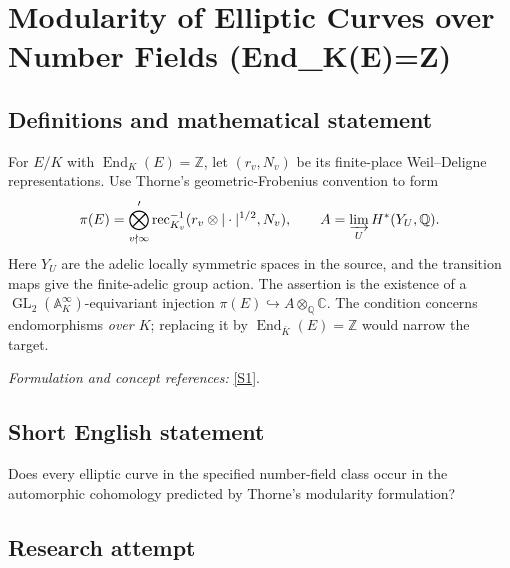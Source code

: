 \documentclass[11pt,a4paper]{article}
\newcommand{\Z}{\mathbb{Z}}
\newcommand{\Q}{\mathbb{Q}}
\newcommand{\C}{\mathbb{C}}
\newcommand{\A}{\mathbb{A}}
\newcommand{\sref}[2]{\hyperlink{source:#1:#2}{[S#2]}}
\newif\ifshowcatalogue
\newcommand{\cataloguescope}[1]{\ifshowcatalogue
 \paragraph{Exact scope in the supplied catalogue.}
 \begin{quote}\small #1\end{quote}\fi}
\numberwithin{equation}{section}
\begin{document}
\setcounter{section}{0}
\clearpage
\section*{\texorpdfstring{Modularity of Elliptic Curves over Number Fields (End\_K(E)=Z)}{Modularity of Elliptic Curves over Number Fields (End\_K(E)=Z)}}\label{statement}
\subsection{Definitions and mathematical statement}
For $E/K$ with $\operatorname{End}_K(E)=\Z$, let $(r_v,N_v)$ be its finite-place Weil--Deligne representations. Use Thorne's geometric-Frobenius convention to form
\[
 \pi(E)=\bigotimes_{v\nmid\infty}'
 \operatorname{rec}_{K_v}^{-1}(r_v\otimes|\cdot|^{1/2},N_v),\qquad
 A=\varinjlim_U H^*(Y_U,\Q).
\]
Here $Y_U$ are the adelic locally symmetric spaces in the source, and the transition maps give the finite-adelic group action. The assertion is the existence of a $\operatorname{GL}_2(\A_K^\infty)$-equivariant injection $\pi(E)\hookrightarrow A\otimes_{\Q}\C$. The condition concerns endomorphisms \emph{over $K$}; replacing it by $\operatorname{End}_{\bar K}(E)=\Z$ would narrow the target.
\par\smallskip\textit{Formulation and concept references:} \sref{statement}{1}.
\cataloguescope{For every number field K and every elliptic curve E/K with End\_K(E)=Z, prove that pi(E) admits a GL\_2(A\_K\textasciicircum{}infinity)-equivariant injection into A tensor\_Q C, exactly as in Thorne's Conjecture 2.6. Here A is the direct limit over open compact U of H\textasciicircum{}*(Y\_U,Q) for the adelic locally symmetric spaces defined on page 647, and pi(E) is the restricted tensor product at all finite places v of rec\_\{K\_v\}\textasciicircum{}\{-1\}(r\_v tensor |.|\textasciicircum{}\{1/2\},N\_v), with (r\_v,N\_v) attached to E in the source's geometric-Frobenius normalization on pages 646 and 649.}
\subsection{Short English statement}
Does every elliptic curve in the specified number-field class occur in the automorphic cohomology predicted by Thorne's modularity formulation?
\subsection{Research attempt}
\end{document}
